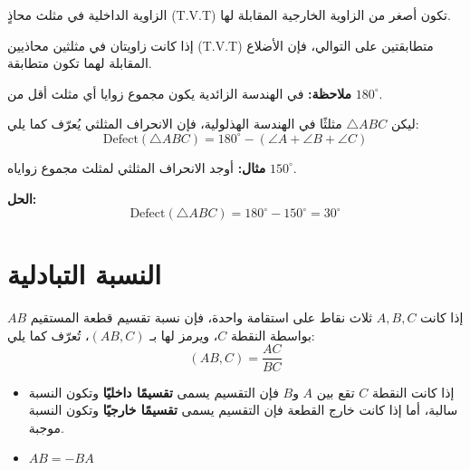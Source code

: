 \begin{theorem}
	\begin{tasks*}
		\item الزاوية الداخلية في مثلث محاذٍ (T.V.T) تكون أصغر من الزاوية الخارجية المقابلة لها.
		
		\item إذا كانت زاويتان في مثلثين محاذيين (T.V.T) متطابقتين على التوالي، فإن الأضلاع المقابلة لهما تكون متطابقة.
	\end{tasks*}
\end{theorem}

\textbf{ملاحظة:} في الهندسة الزائدية يكون مجموع زوايا أي مثلث أقل من $180^\circ$.

\begin{definition}
	ليكن $\triangle ABC$ مثلثًا في الهندسة الهذلولية، فإن الانحراف المثلثي يُعرّف كما يلي:
	\[
	\mathrm{Defect}(\triangle ABC) = 180^\circ - (\angle A + \angle B + \angle C)
	\]
\end{definition}

\textbf{مثال:} أوجد الانحراف المثلثي لمثلث مجموع زواياه $150^\circ$.

\textbf{الحل:}
\[
\mathrm{Defect}(\triangle ABC) = 180^\circ - 150^\circ = 30^\circ
\]

\section[النسبة التبادلية]{النسبة التبادلية \cite{ref4}}

إذا كانت $A, B, C$ ثلاث نقاط على استقامة واحدة، فإن نسبة تقسيم قطعة المستقيم $AB$ بواسطة النقطة $C$، ويرمز لها بـ $(AB, C)$، تُعرّف كما يلي:
\[
(AB, C) = \frac{AC}{BC}
\]

\begin{itemize}[label*=\textbullet]
	\item إذا كانت النقطة $C$ تقع بين $A$ و$B$ فإن التقسيم يسمى \textbf{تقسيمًا داخليًا} وتكون النسبة سالبة، أما إذا كانت خارج القطعة فإن التقسيم يسمى \textbf{تقسيمًا خارجيًا} وتكون النسبة موجبة.
	\item $AB = -BA$
\end{itemize}


